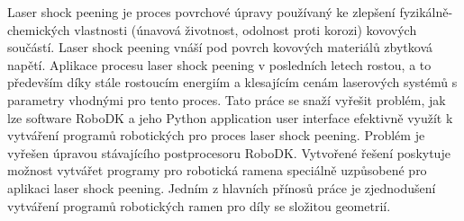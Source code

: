 ﻿%
Laser shock peening je proces povrchové úpravy používaný ke zlepšení fyzikálně-chemických vlastnosti (únavová životnost, odolnost proti korozi) kovových součástí. Laser shock peening vnáší pod povrch kovových materiálů zbytková napětí. Aplikace procesu laser shock peening v posledních letech rostou, a to především díky stále rostoucím energiím a klesajícím cenám laserových systémů s parametry vhodnými pro tento proces. Tato práce se snaží vyřešit problém, jak lze software RoboDK a jeho Python application user interface efektivně využít k vytváření programů robotických pro proces laser shock peening. Problém je vyřešen úpravou stávajícího postprocesoru RoboDK. Vytvořené řešení poskytuje možnost vytvářet programy pro robotická ramena speciálně uzpůsobené pro aplikaci laser shock peening. Jedním z hlavních přínosů práce je zjednodušení vytváření programů robotických ramen pro díly se složitou geometrií.


